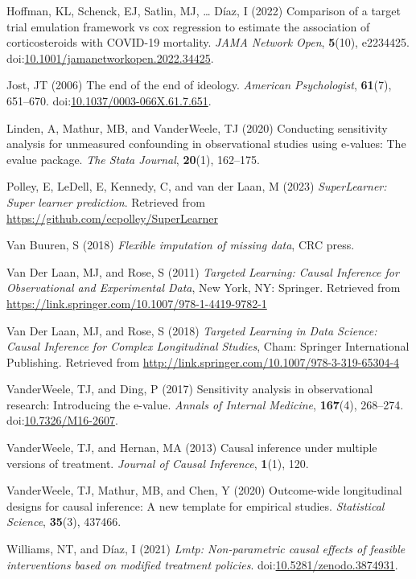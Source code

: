 \documentclass[
  singlecolumn]{article}
\newlength{\cslhangindent}
\newenvironment{CSLReferences}[2] %
 {\begin{list}{}{%
  \setlength{\itemindent}{0pt}
  \setlength{\leftmargin}{0pt}
  \setlength{\parsep}{0pt}
  \ifodd #1
   \setlength{\leftmargin}{\cslhangindent}
   \setlength{\itemindent}{-1\cslhangindent}
  \fi
  \setlength{\itemsep}{#2\baselineskip}}}
 {\end{list}}
\begin{document}
\begin{CSLReferences}{1}{0}
Hoffman, KL, Schenck, EJ, Satlin, MJ, \ldots{} Díaz, I (2022) Comparison
of a target trial emulation framework vs cox regression to estimate the
association of corticosteroids with COVID-19 mortality. \emph{JAMA
Network Open}, \textbf{5}(10), e2234425.
doi:\href{https://doi.org/10.1001/jamanetworkopen.2022.34425}{10.1001/jamanetworkopen.2022.34425}.

Jost, JT (2006) The end of the end of ideology. \emph{American
Psychologist}, \textbf{61}(7), 651--670.
doi:\href{https://doi.org/10.1037/0003-066X.61.7.651}{10.1037/0003-066X.61.7.651}.

Linden, A, Mathur, MB, and VanderWeele, TJ (2020) Conducting sensitivity
analysis for unmeasured confounding in observational studies using
e-values: The evalue package. \emph{The Stata Journal}, \textbf{20}(1),
162--175.

Polley, E, LeDell, E, Kennedy, C, and van der Laan, M (2023)
\emph{SuperLearner: Super learner prediction}. Retrieved from
\url{https://github.com/ecpolley/SuperLearner}

Van Buuren, S (2018) \emph{Flexible imputation of missing data}, CRC
press.

Van Der Laan, MJ, and Rose, S (2011) \emph{Targeted Learning: Causal
Inference for Observational and Experimental Data}, New York, NY:
Springer. Retrieved from
\url{https://link.springer.com/10.1007/978-1-4419-9782-1}

Van Der Laan, MJ, and Rose, S (2018) \emph{Targeted Learning in Data
Science: Causal Inference for Complex Longitudinal Studies}, Cham:
Springer International Publishing. Retrieved from
\url{http://link.springer.com/10.1007/978-3-319-65304-4}

VanderWeele, TJ, and Ding, P (2017) Sensitivity analysis in
observational research: Introducing the e-value. \emph{Annals of
Internal Medicine}, \textbf{167}(4), 268--274.
doi:\href{https://doi.org/10.7326/M16-2607}{10.7326/M16-2607}.

VanderWeele, TJ, and Hernan, MA (2013) Causal inference under multiple
versions of treatment. \emph{Journal of Causal Inference},
\textbf{1}(1), 120.

VanderWeele, TJ, Mathur, MB, and Chen, Y (2020) Outcome-wide
longitudinal designs for causal inference: A new template for empirical
studies. \emph{Statistical Science}, \textbf{35}(3), 437466.

Williams, NT, and Díaz, I (2021) \emph{Lmtp: Non-parametric causal
effects of feasible interventions based on modified treatment policies}.
doi:\href{https://doi.org/10.5281/zenodo.3874931}{10.5281/zenodo.3874931}.

\end{CSLReferences}
\end{document}
